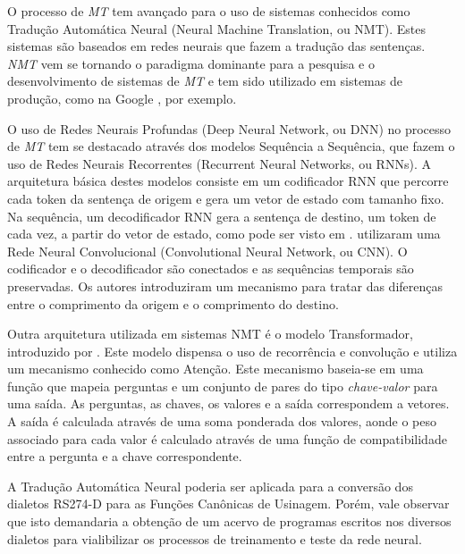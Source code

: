 \documentclass[a4paper]{article}
\begin{document}
    O processo de \emph{MT} tem avan\c cado para o uso de sistemas conhecidos como Tradu\c c\~ao 
    Autom\'atica Neural (Neural Machine Translation, ou NMT).
    Estes sistemas s\~ao baseados em redes neurais que fazem a tradu\c c\~ao das senten\c cas.
    \emph{NMT} vem se tornando o paradigma dominante para a pesquisa e o desenvolvimento 
    de sistemas de \emph{MT} e tem sido utilizado em sistemas de produ\c c\~ao, como na Google
    \cite{wu:2016}, por exemplo.
    
    O uso de Redes Neurais Profundas (Deep Neural Network, ou DNN) no processo de \emph{MT}
    tem se destacado atrav\'es dos modelos Sequ\^encia a Sequ\^encia, que fazem o uso de 
    Redes Neurais Recorrentes (Recurrent Neural Networks, ou RNNs).
    A arquitetura b\'asica destes modelos consiste em um codificador RNN que percorre cada 
    token da senten\c ca de origem e gera um vetor de estado com tamanho fixo.
    Na sequ\^encia, um decodificador RNN gera a senten\c ca de destino, um token de cada vez,
    a partir do vetor de estado, como pode ser visto em \textcite{sutskever:2014}.
    \textcite{kalchbrenner:2016} utilizaram uma Rede Neural Convolucional (Convolutional 
    Neural Network, ou CNN). O codificador e o decodificador s\~ao conectados e as sequ\^encias 
    temporais s\~ao preservadas. Os autores introduziram um mecanismo para tratar das 
    diferen\c cas entre o comprimento da origem e o comprimento do destino.
    
    Outra arquitetura utilizada em sistemas NMT \'e o modelo Transformador, introduzido por
    \textcite{vaswani:2017attention}. Este modelo dispensa o uso de recorr\^encia e convolu\c c\~ao
    e utiliza um mecanismo conhecido como Aten\c c\~ao.
    Este mecanismo baseia-se em uma fun\c c\~ao que mapeia perguntas e um conjunto de pares do 
    tipo \emph{chave-valor} para uma sa\'ida. As perguntas, as chaves, os valores e a sa\'ida
    correspondem a vetores. A sa\'ida \'e calculada atrav\'es de uma soma ponderada dos valores,
    aonde o peso associado para cada valor \'e calculado atrav\'es de uma fun\c c\~ao de 
    compatibilidade entre a pergunta e a chave correspondente.
    
    A Tradução Automática Neural poderia ser aplicada para a conversão dos dialetos RS274-D 
    para as Funções Canônicas de Usinagem. Porém, vale observar que isto demandaria a obtenção de 
    um acervo de programas escritos nos diversos dialetos para vialibilizar os processos de 
    treinamento e teste da rede neural.
    






 
\end{document}
